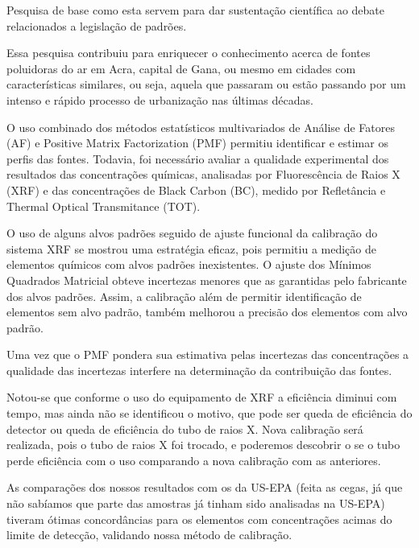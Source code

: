 
Pesquisa de base como esta servem para dar sustentação científica 
ao debate relacionados a legislação de padrões.

Essa pesquisa contribuiu para enriquecer o conhecimento acerca de fontes poluidoras do ar em Acra, capital de Gana, ou mesmo em cidades com características similares, ou seja, aquela que passaram ou estão passando por um intenso e rápido processo de urbanização nas últimas décadas.  

O uso combinado dos  métodos estatísticos multivariados de Análise de Fatores (AF) e Positive Matrix Factorization (PMF) permitiu identificar e estimar os perfis das fontes. Todavia, foi necessário avaliar
a qualidade experimental dos resultados das concentrações químicas, analisadas por Fluorescência de Raios X (XRF) e das concentrações de Black Carbon (BC), medido por Refletância e Thermal Optical Transmitance (TOT). 

O uso de alguns alvos padrões seguido de ajuste funcional da calibração do sistema XRF se mostrou uma estratégia eficaz, pois permitiu a medição de elementos químicos com alvos padrões inexistentes. O ajuste dos Mínimos Quadrados Matricial obteve incertezas menores que as garantidas pelo fabricante dos alvos padrões. Assim, a calibração além de permitir identificação de elementos sem alvo padrão, também melhorou a precisão dos elementos com alvo padrão. 

Uma vez que o PMF pondera sua estimativa pelas incertezas das concentrações a qualidade das incertezas interfere na determinação da contribuição das fontes.

Notou-se que conforme o uso do equipamento de XRF a eficiência diminui com tempo, mas ainda não se identificou o motivo, que pode ser queda de eficiência do detector ou queda de eficiência do tubo de raios X. Nova calibração será realizada, pois o tubo de raios X foi trocado, e poderemos descobrir o se o tubo perde eficiência com o uso comparando a nova calibração com as anteriores. 

As comparações dos nossos resultados com os da US-EPA (feita as cegas, já que não sabíamos que parte das amostras já tinham sido analisadas na US-EPA) tiveram ótimas concordâncias para os elementos com concentrações acimas do limite de detecção, validando nossa método de calibração.   

